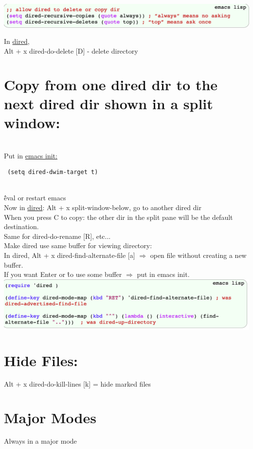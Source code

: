 \documentclass{article}
\begin{document}
\includegraphics[width=\linewidth]{delete-directory.png}

In \underline{dired}, 
\\
Alt + x dired-do-delete [D] - delete directory
\\
\section{Copy from one dired dir to the next dired dir shown in a split window:}
\\
Put in \underline{emacs init:}
\\
\begin{verbatim} (setq dired-dwim-target t)\end{verbatim}
\\
\^\^ eval or restart emacs
\\
Now in \underline{dired}: Alt + x split-window-below, go to another dired dir
\\
When you press C to copy: the other dir in the split pane will be the default destination.
\\
Same for dired-do-rename [R], etc...
\\
Make dired use same buffer for viewing directory:
\\
In dired, Alt + x dired-find-alternate-file [a] $\Rightarrow$ open file without creating a new buffer.
\\
If you want Enter or \^ to use some buffer $\Rightarrow$ put in emacs init.
\\
\includegraphics[width=\linewidth]{samebuffer.png}
\section{Hide Files:}
Alt + x dired-do-kill-lines [k] = hide marked files
\\
\section{Major Modes}
Always in a major mode
\end{document}
